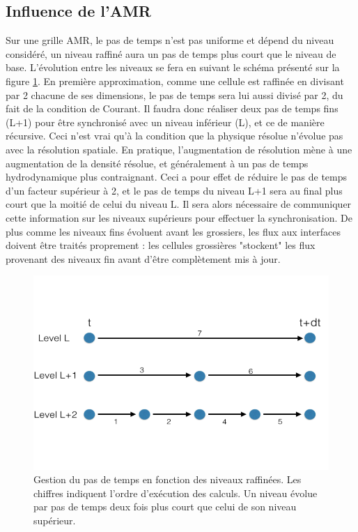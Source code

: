 \subsection{Influence de l'AMR}

Sur une grille \ac{AMR}, le pas de temps n'est pas uniforme et dépend du niveau considéré, un niveau raffiné aura un pas de temps plus court que le niveau de base.
L'évolution entre les niveaux se fera en suivant le schéma présenté sur la figure \ref{fig:timestep}.
En première approximation, comme une cellule est raffinée en divisant par 2 chacune de ses dimensions, le pas de temps sera lui aussi divisé par 2, du fait de la condition de Courant.
Il faudra donc réaliser deux pas de temps fins (L+1) pour être synchronisé avec un niveau inférieur (L), et ce de manière récursive.
Ceci n'est vrai qu'à la condition que la physique résolue n'évolue pas avec la résolution spatiale.
En pratique, l'augmentation de résolution mène à une augmentation de la densité résolue, et généralement à un pas de temps hydrodynamique plus contraignant.
Ceci a pour effet de réduire le pas de temps d'un facteur supérieur à 2, et le pas de temps du niveau L+1 sera au final plus court que la moitié de celui du niveau L.
Il sera alors nécessaire de communiquer cette information sur les niveaux supérieurs pour effectuer la synchronisation.
De plus comme les niveaux fins évoluent avant les grossiers, les flux aux interfaces doivent être traités proprement : les cellules grossières "stockent" les flux provenant des niveaux fin avant  d'être complètement mis à jour.

\begin{figure}
\includegraphics[width=.8\linewidth]{img/02/tstep.png}
\caption[Pas de temps AMR]{Gestion du pas de temps en fonction des niveaux raffinées.
Les chiffres indiquent l'ordre d’exécution des calculs.
Un niveau évolue par pas de temps deux fois plus court que celui de son niveau supérieur.
\label{fig:timestep}}
\end{figure}


